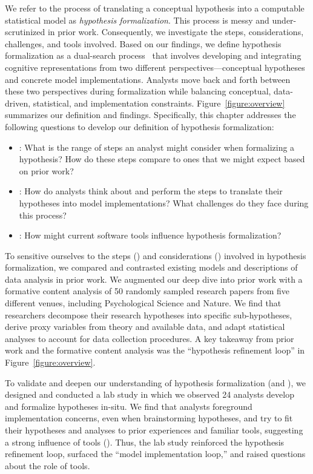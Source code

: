 We refer to the process of translating a conceptual hypothesis into a computable
statistical model as \textit{hypothesis formalization}. This process is  messy
and under-scrutinized in prior work. Consequently, we investigate the steps,
considerations, challenges, and tools involved. Based on our findings, we define
hypothesis formalization as a dual-search process~\cite{klahr1988dual} that
involves developing and integrating cognitive representations from two different
perspectives---conceptual hypotheses and concrete model implementations.
Analysts move back and forth between these two perspectives during formalization
while balancing conceptual, data-driven, statistical, and implementation
constraints. Figure~\ref{figure:overview} summarizes our definition and
findings. Specifically, this chapter addresses the following questions to
develop our definition of hypothesis formalization:
\begin{itemize}
    \item \rqSteps: What is the range of steps an analyst might consider when
    formalizing a hypothesis? How do these steps compare to ones that we might
    expect based on prior work?
    \item \rqProcess: How do analysts think about and perform the steps to
    translate their hypotheses into model implementations? What challenges do
    they face during this process?
    \item \rqTools: How might current software tools influence hypothesis
    formalization?
\end{itemize}

To sensitive ourselves to the steps (\rqSteps) and considerations (\rqProcess)
involved in hypothesis formalization, we compared and contrasted existing models
and descriptions of data analysis in prior work. We augmented our deep dive into
prior work with a formative content analysis of 50 randomly sampled research
papers from five different venues, including Psychological Science and Nature.
We find that researchers decompose their research hypotheses into specific
sub-hypotheses, derive proxy variables from theory and available data, and adapt
statistical analyses to account for data collection procedures. A key takeaway
from prior work and the formative content analysis was the ``hypothesis
refinement loop'' in Figure~\ref{figure:overview}. 

\figureOverivew

To validate and deepen our understanding of
hypothesis formalization (\rqSteps and \rqProcess), we designed and conducted a
lab study in which we observed 24 analysts develop and formalize hypotheses
in-situ. We find that analysts foreground implementation concerns, even when
brainstorming hypotheses, and try to fit their hypotheses and analyses to prior
experiences and familiar tools, suggesting a strong influence of tools
(\rqTools). Thus, the lab study reinforced the hypothesis refinement loop,
surfaced the ``model implementation loop,'' and raised questions about the role
of tools. 

